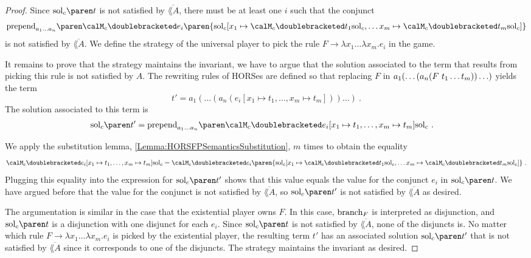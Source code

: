 \documentclass[../../diss.tex]{subfiles}
\begin{document}
\begin{proof}
    Since $\solc{t}$ is not satisfied by $\overline{\lang{A}}$, there must be at least one $i$ such that the conjunct
    \[
        \prepend{a_1 \ldots a_n}%
        {%
        \semc{e_i}{ \paren{\solc [x_1 \mapsto \semc{t_1}{\solc}, \ldots x_m \mapsto \semc{t_m}{\solc}]} }
        }
    \]
    is not satisfied by $\overline{\lang{A}}$.
    We define the strategy of the universal player to pick the rule
    $F \to \lambda x_1 \ldots \lambda x_m . e_i$ in the game.

    It remains to prove that the strategy maintains the invariant, \ie we have to argue that the solution associated to the term that results from picking this rule is not satisfied by $A$.
    The rewriting rules of HORSes are defined so that replacing $F$ in $a_1(\ldots(a_n(F \  t_1 \ldots t_m)) \ldots)$ yields the term
    \[
        t' = a_1(\ldots(a_n(e_i [x_1 \mapsto t_1,  \ldots, x_m \mapsto t_m])) \ldots)
        \ .
    \]
    The solution associated to this term is
    \begin{align*}
        \solc{t'}
        &=
        \prepend{a_1 \ldots a_n}%
        {%
        \semc{e_i [x_1 \mapsto t_1,  \ldots, x_m \mapsto t_m ] }{ \solc }
        }
        \ .
    \end{align*}

    We apply the substitution lemma, \cref{Lemma:HORSFPSemanticsSubstitution}, $m$ times to obtain the equality
    \[
        \semc{e_i [x_1 \mapsto t_1,  \ldots, x_m \mapsto t_m ] }{ \solc }
        =
        \semc{e_i}{ \paren{\solc [x_1 \mapsto \semc{t_1}{\solc}, \ldots x_m \mapsto \semc{t_m}{\solc}]} }
        \ .
    \]
    Plugging this equality into the expression for $\solc{t'}$ shows that this value equals the value for the conjunct $e_i$ in $\solc{t}$.
    We have argued before that the value for the conjunct is not satisfied by $\overline{\lang{A}}$, so $\solc{t'}$ is not satisfied by $\overline{\lang{A}}$ as desired.

    The argumentation is similar in the case that the existential player owns $F$.
    In this case, $\text{branch}_{F}$ is interpreted as disjunction, and $\solc{t}$ is a disjunction with one disjunct for each $e_i$.
    Since $\solc{t}$ is not satisfied by $\overline{\lang{A}}$, none of the disjuncts is.
    No matter which rule $F \to \lambda x_1 \ldots \lambda x_m . e_i$ is picked by the existential player, the resulting term $t'$ has an associated solution $\solc{t'}$ that is not satisfied by $\overline{\lang{A}}$ since it corresponds to one of the disjuncts.
    The strategy maintains the invariant as desired.
\end{proof}
\end{document}
